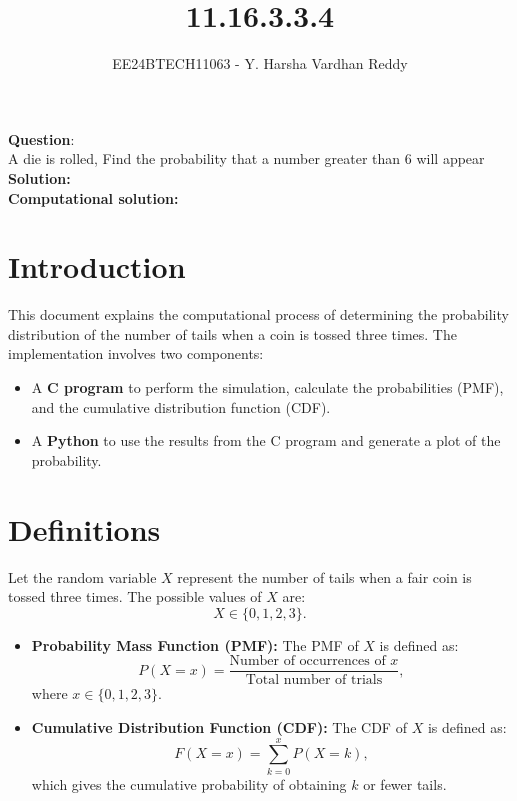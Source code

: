 \documentclass[journal]{IEEEtran}
\begin{document}
	
	
	\vspace{3cm}
	
	\title{11.16.3.3.4}
	\author{EE24BTECH11063 - Y. Harsha Vardhan Reddy }
	{\let\newpage\relax\maketitle}
	
	\renewcommand{\thefigure}{\theenumi}
	\renewcommand{\thetable}{\theenumi}
	\setlength{\intextsep}{10pt} %
	
	
	\renewcommand{\thetable}{\theenumi}
	
	
\textbf{Question}:\\
A die is rolled, Find the probability that a number greater than 6 will appear \\
\textbf{Solution: }\\
\textbf{Computational solution: }\\

\section*{Introduction}
This document explains the computational process of determining the probability distribution of the number of tails when a coin is tossed three times. The implementation involves two components:
\begin{itemize}
    \item A \textbf{C program} to perform the simulation, calculate the probabilities (PMF), and the cumulative distribution function (CDF).
    \item A \textbf{Python} to use the results from the C program and generate a plot of the probability.
\end{itemize}

\section*{Definitions}
Let the random variable \( X \) represent the number of tails when a fair coin is tossed three times. The possible values of \( X \) are:
\[
X \in \{0, 1, 2, 3\}.
\]
\begin{itemize}
    \item \textbf{Probability Mass Function (PMF):} The PMF of \( X \) is defined as:
    \[
    P(X = x) = \frac{\text{Number of occurrences of } x}{\text{Total number of trials}},
    \]
    where \( x \in \{0, 1, 2, 3\} \).
    \item \textbf{Cumulative Distribution Function (CDF):} The CDF of \( X \) is defined as:
    \[
    F(X = x) = \sum_{k=0}^{x} P(X = k),
    \]
    which gives the cumulative probability of obtaining \( k \) or fewer tails.
\end{itemize}
\end{document}
